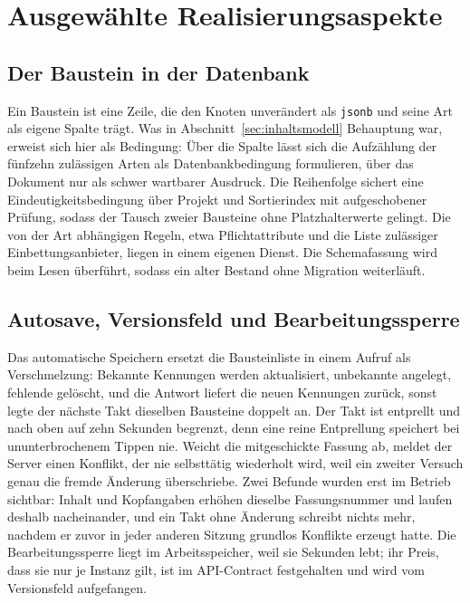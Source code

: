 \section{Ausgewählte Realisierungsaspekte}
\label{sec:realisierungsaspekte}

\subsection{Der Baustein in der Datenbank}
\label{subsec:baustein-db}

Ein Baustein ist eine Zeile, die den Knoten unverändert als \texttt{jsonb} und seine Art als eigene Spalte trägt. Was in Abschnitt~\ref{sec:inhaltsmodell} Behauptung war, erweist sich hier als Bedingung: Über die Spalte lässt sich die Aufzählung der fünfzehn zulässigen Arten als Datenbankbedingung formulieren, über das Dokument nur als schwer wartbarer Ausdruck. Die Reihenfolge sichert eine Eindeutigkeitsbedingung über Projekt und Sortierindex mit aufgeschobener Prüfung, sodass der Tausch zweier Bausteine ohne Platzhalterwerte gelingt. Die von der Art abhängigen Regeln, etwa Pflichtattribute und die Liste zulässiger Einbettungsanbieter, liegen in einem eigenen Dienst. Die Schemafassung wird beim Lesen überführt, sodass ein alter Bestand ohne Migration weiterläuft.

\subsection{Autosave, Versionsfeld und Bearbeitungssperre}
\label{subsec:autosave}

Das automatische Speichern ersetzt die Bausteinliste in einem Aufruf als Verschmelzung: Bekannte Kennungen werden aktualisiert, unbekannte angelegt, fehlende gelöscht, und die Antwort liefert die neuen Kennungen zurück, sonst legte der nächste Takt dieselben Bausteine doppelt an. Der Takt ist entprellt und nach oben auf zehn Sekunden begrenzt, denn eine reine Entprellung speichert bei ununterbrochenem Tippen nie. Weicht die mitgeschickte Fassung ab, meldet der Server einen Konflikt, der nie selbsttätig wiederholt wird, weil ein zweiter Versuch genau die fremde Änderung überschriebe. Zwei Befunde wurden erst im Betrieb sichtbar: Inhalt und Kopfangaben erhöhen dieselbe Fassungsnummer und laufen deshalb nacheinander, und ein Takt ohne Änderung schreibt nichts mehr, nachdem er zuvor in jeder anderen Sitzung grundlos Konflikte erzeugt hatte. Die Bearbeitungssperre liegt im Arbeitsspeicher, weil sie Sekunden lebt; ihr Preis, dass sie nur je Instanz gilt, ist im API-Contract festgehalten und wird vom Versionsfeld aufgefangen.

